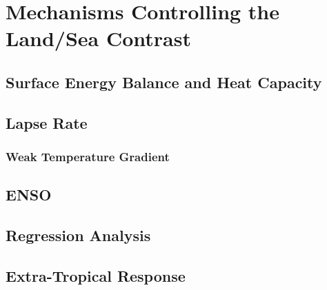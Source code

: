 \chapter{Mechanisms Controlling the Land/Sea Contrast} 

\label{mechanisms} 




\section{Surface Energy Balance and Heat Capacity}


\section{Lapse Rate}

\subsection{Weak Temperature Gradient}




\section{ENSO}




\section{Regression Analysis}



\section{Extra-Tropical Response}
